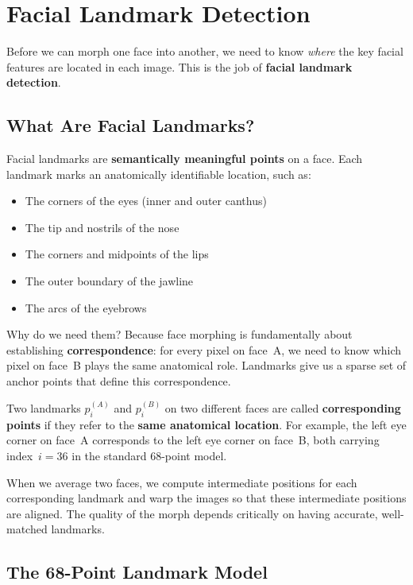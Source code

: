 \section{Facial Landmark Detection}

Before we can morph one face into another, we need to know \emph{where} the key facial features are located in each image. This is the job of \textbf{facial landmark detection}.

\subsection{What Are Facial Landmarks?}

Facial landmarks are \textbf{semantically meaningful points} on a face. Each landmark marks an anatomically identifiable location, such as:

\begin{itemize}
    \item The corners of the eyes (inner and outer canthus)
    \item The tip and nostrils of the nose
    \item The corners and midpoints of the lips
    \item The outer boundary of the jawline
    \item The arcs of the eyebrows
\end{itemize}

Why do we need them? Because face morphing is fundamentally about establishing \textbf{correspondence}: for every pixel on face~A, we need to know which pixel on face~B plays the same anatomical role. Landmarks give us a sparse set of anchor points that define this correspondence.

\begin{definition}
    Two landmarks $p_i^{(A)}$ and $p_i^{(B)}$ on two different faces are called \textbf{corresponding points} if they refer to the \textbf{same anatomical location}. For example, the left eye corner on face~A corresponds to the left eye corner on face~B, both carrying index~$i = 36$ in the standard 68-point model.
\end{definition}

When we average two faces, we compute intermediate positions for each corresponding landmark and warp the images so that these intermediate positions are aligned. The quality of the morph depends critically on having accurate, well-matched landmarks.

\subsection{The 68-Point Landmark Model}

